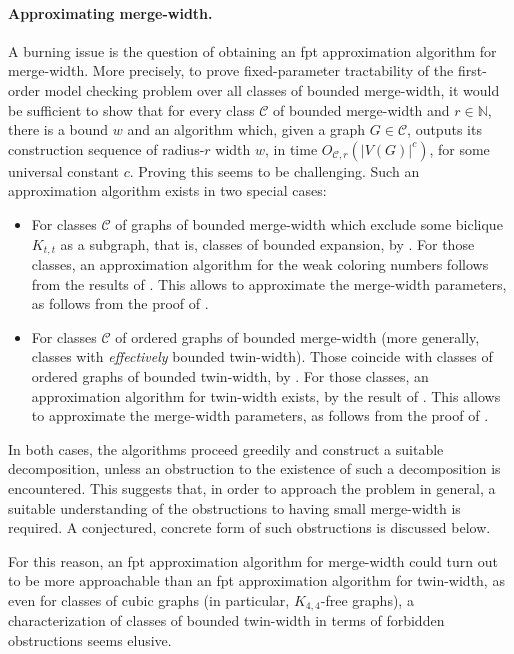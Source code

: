 \documentclass[11pt]{article}
\theoremstyle{remark}
\def\cal{\mathcal}
\def\N{\mathbb N}
\newcommand{\CC}{\cal C}
\begin{document}
\paragraph{Approximating merge-width.}
A burning issue is the question of obtaining
an fpt approximation algorithm for merge-width.
More precisely, to prove fixed-parameter tractability of the first-order model checking problem over all classes of bounded merge-width,
it would be sufficient to show that for every class $\CC$ of bounded merge-width and $r\in\N$, there is a bound $w$ and an algorithm
which, given a graph $G\in\CC$, outputs
its construction sequence of radius-$r$ width $w$,
 in time $O_{\CC,r}(|V(G)|^c)$, for some universal constant $c$.
 Proving this seems to be challenging.
 Such an approximation algorithm exists
 in two special cases:
 \begin{itemize}
  \item For classes $\CC$ of graphs of bounded merge-width which exclude some biclique $K_{t,t}$ as a subgraph,
  that is, classes of bounded expansion, by  .
  For those classes, an approximation algorithm for the weak coloring numbers follows from the results of \cite{dvorak-admissibility}. This allows to approximate the merge-width parameters, as follows from the proof of .
  \item
  For classes $\CC$ of ordered graphs of bounded merge-width
  (more generally, classes with \emph{effectively} bounded twin-width). Those coincide with classes of ordered graphs of bounded twin-width, by .
  For those classes, an approximation algorithm for twin-width exists, by the result of \cite{tww4}. This allows to approximate the merge-width parameters, as follows from the proof of .
 \end{itemize}

 In both cases, the algorithms proceed greedily and construct a suitable decomposition, unless  an obstruction to the existence of such a decomposition is encountered. This suggests
 that, in order to approach the problem in general, a suitable understanding of the obstructions to having small merge-width is required. A conjectured, concrete form of such obstructions is discussed below.

 For this reason, an fpt approximation algorithm for merge-width could turn out to be more approachable than an fpt approximation algorithm for twin-width, as even for classes of cubic graphs (in particular, $K_{4,4}$-free graphs),
 a characterization of classes of bounded twin-width in terms of forbidden obstructions seems elusive.
\end{document}
